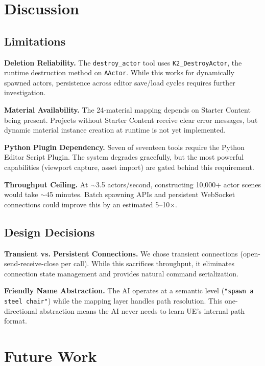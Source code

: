 \documentclass[conference]{IEEEtran}
\begin{document}
\section{Discussion}

\subsection{Limitations}

\textbf{Deletion Reliability.} The \texttt{destroy\_actor} tool uses \texttt{K2\_DestroyActor}, the runtime destruction method on \texttt{AActor}. While this works for dynamically spawned actors, persistence across editor save/load cycles requires further investigation.

\textbf{Material Availability.} The 24-material mapping depends on Starter Content being present. Projects without Starter Content receive clear error messages, but dynamic material instance creation at runtime is not yet implemented.

\textbf{Python Plugin Dependency.} Seven of seventeen tools require the Python Editor Script Plugin. The system degrades gracefully, but the most powerful capabilities (viewport capture, asset import) are gated behind this requirement.

\textbf{Throughput Ceiling.} At $\sim$3.5 actors/second, constructing 10,000+ actor scenes would take $\sim$45 minutes. Batch spawning APIs and persistent WebSocket connections could improve this by an estimated 5--10$\times$.

\subsection{Design Decisions}

\textbf{Transient vs. Persistent Connections.} We chose transient connections (open-send-receive-close per call). While this sacrifices throughput, it eliminates connection state management and provides natural command serialization.

\textbf{Friendly Name Abstraction.} The AI operates at a semantic level (\texttt{"spawn a steel chair"}) while the mapping layer handles path resolution. This one-directional abstraction means the AI never needs to learn UE's internal path format.

\section{Future Work}
\end{document}
